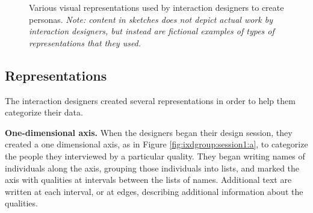 \documentclass[12pt,fleqn]{ucithesis}
\begin{document}
\begin{figure}%
  \centering
   \caption {Various visual representations used by interaction designers to create personas. \textit{Note: content in sketches does not depict actual work by interaction designers, but instead are fictional examples of types of representations that they used.}}
   \label{fig:ixdgroup:session1}
\end{figure}%

\subsection{Representations}

The interaction designers created several representations in order to help them categorize their data. 

\textbf{One-dimensional axis.} When the designers began their design session, they created a one dimensional axis, as in Figure \ref{fig:ixdgroup:session1:a}, to categorize the people they interviewed by a particular quality. They began writing names of individuals along the axis, grouping those individuals into lists, and marked the axis with qualities at intervals between the lists of names. Additional text are written at each interval, or at edges, describing additional information about the qualities.
\end{document}

